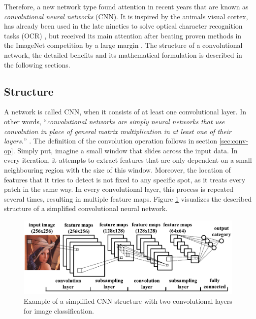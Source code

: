 Therefore, a new network type found attention in recent years that are known as \textit{convolutional neural networks} (CNN). It is inspired by the animals visual cortex, has already been used in the late nineties to solve optical character recognition tasks (OCR) \parencite{lecun_conv}, but received its main attention after beating proven methods in the ImageNet competition by a large margin \parencite{imagenet}. The structure of a convolutional network, the detailed benefits and its mathematical formulation is described in the following sections.


\subsection{Structure}

A network is called CNN, when it consists of at least one convolutional layer. In other words, ``\textit{convolutional networks are simply neural networks that use convolution in place of general matrix multiplication in at least one of their layers.}'' \parencite{deep_learning}. The definition of the convolution operation follows in section \ref{sec:conv-op}. Simply put, imagine a small window that slides across the input data. In every iteration, it attempts to extract features that are only dependent on a small neighbouring region with the size of this window. Moreover, the location of features that it tries to detect is not fixed to any specific spot, as it treats every patch in the same way. In every convolutional layer, this process is repeated several times, resulting in multiple feature maps. Figure \ref{fig:cnn-structure} visualizes the described structure of a simplified convolutional neural network.

\begin{figure}[htpb]
	\centering
	\includegraphics[scale=0.35]{figures/cnn_structure.png}
	\caption[Structure of a CNN]{Example of a simplified CNN structure with two convolutional layers for image classification.} \label{fig:cnn-structure}
\end{figure}

